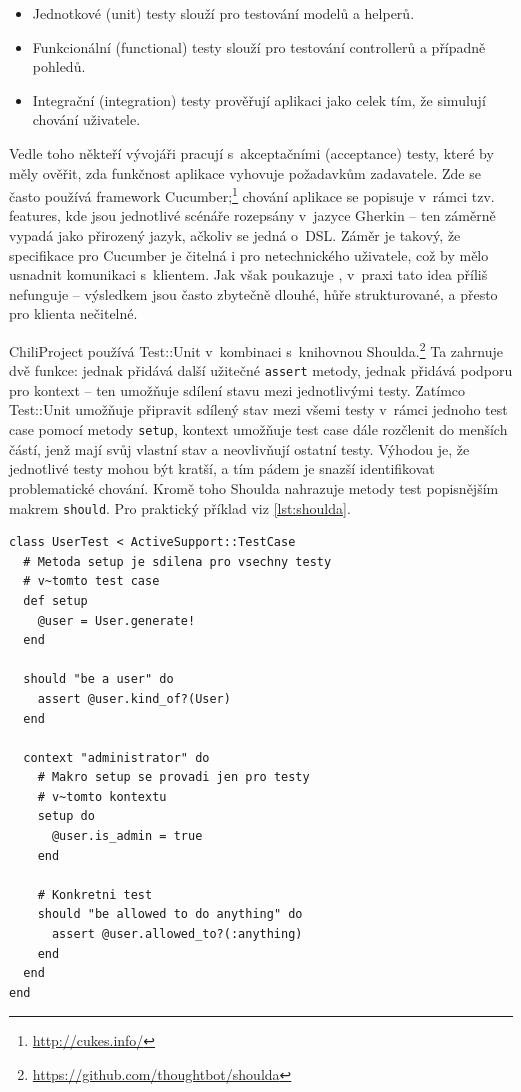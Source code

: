 \documentclass[thesis=B,czech]{FITthesis}[2012/05/02]
\begin{document}
\begin{itemize}
\item
  Jednotkové (unit) testy slouží pro testování modelů a helperů.
\item
  Funkcionální (functional) testy slouží pro testování controllerů a
  případně pohledů.
\item
  Integrační (integration) testy prověřují aplikaci jako celek tím, že
  simulují chování uživatele.
\end{itemize}
Vedle toho někteří vývojáři pracují s~akceptačními (acceptance) testy,
které by měly ověřit, zda funkčnost aplikace vyhovuje požadavkům
zadavatele. Zde se často používá framework Cucumber;\footnote{\url{http://cukes.info/}}
chování aplikace se popisuje v~rámci tzv. features, kde jsou jednotlivé
scénáře rozepsány v~jazyce Gherkin -- ten záměrně vypadá jako přirozený
jazyk, ačkoliv se jedná o~\gls{DSL}. Záměr je takový, že specifikace pro
Cucumber je čitelná i pro netechnického uživatele, což by mělo usnadnit
komunikaci s~klientem. Jak však poukazuje \citep{Kinsella2011}, v~praxi
tato idea příliš nefunguje -- výsledkem jsou často  zbytečně dlouhé, hůře strukturované, a přesto pro
klienta nečitelné.

ChiliProject používá Test::Unit v~kombinaci s~knihovnou
Shoulda.\footnote{\url{https://github.com/thoughtbot/shoulda}} Ta
zahrnuje dvě funkce: jednak přidává další užitečné \lstinline!assert!
metody, jednak přidává podporu pro kontext -- ten umožňuje sdílení stavu
mezi jednotlivými testy. Zatímco Test::Unit umožňuje připravit sdílený
stav mezi všemi testy v~rámci jednoho test case pomocí metody
\lstinline!setup!, kontext umožňuje test case dále rozčlenit do menších
částí, jenž mají svůj vlastní stav a neovlivňují ostatní testy. Výhodou je,
že jednotlivé testy mohou být kratší, a tím pádem je snazší
identifikovat problematické chování. Kromě toho Shoulda nahrazuje metody
test popisnějším makrem \lstinline!should!. Pro praktický příklad viz \autoref{lst:shoulda}.

\begin{lstlisting}[float,caption={Test case s~frameworky Test::Unit a Shoulda},label=lst:shoulda]
class UserTest < ActiveSupport::TestCase
  # Metoda setup je sdilena pro vsechny testy
  # v~tomto test case
  def setup
    @user = User.generate!
  end

  should "be a user" do
    assert @user.kind_of?(User)
  end

  context "administrator" do
    # Makro setup se provadi jen pro testy
    # v~tomto kontextu
    setup do
      @user.is_admin = true
    end

    # Konkretni test
    should "be allowed to do anything" do
      assert @user.allowed_to?(:anything)
    end
  end
end
\end{lstlisting}
\end{document}
